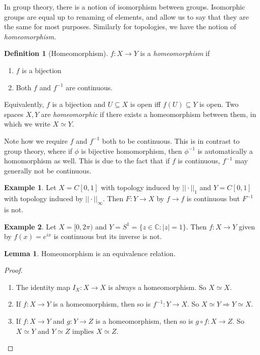 \documentclass[a4paper,11pt]{article}
\theoremstyle{definition}
\newtheorem*{defn}{Definition}
\newtheorem*{ex}{Example}
\newtheorem*{lem}{Lemma}
\numberwithin{equation}{section}
\begin{document}
In group theory, there is a notion of isomorphism between groups. Isomorphic groups are equal up to renaming of elements, and allow us to say that they are the same for most purposes. Similarly for topologies, we have the notion of \emph{homeomorphism}. 

\begin{defn}[Homeomorphism]
$f:X\rightarrow Y$ is a \emph{homeomorphism} if 
\begin{enumerate}
    \item $f$ is a bijection
    \item Both $f$ and $f^{-1}$ are continuous.
\end{enumerate}
Equivalently, $f$ is a bijection and $U\subseteq X$ is open iff $f(U)\subseteq Y$ is open. 
Two spaces $X,Y$ are \emph{homeomorphic} if there exists a homeomorphism between them, in which we write $X\simeq Y$.
\end{defn}

Note how we require $f$ and $f^{-1}$ both to be continuous. This is in contrast to group theory, where if $\phi$ is bijective homomorphism, then $\phi^{-1}$ is automatically a homomorphism as well. This is due to the fact that if $f$ is continuous, $f^{-1}$ may generally not be continuous.

\begin{ex}
Let $X=C[0,1]$ with topology induced by $||\cdot||_1$ and $Y=C[0,1]$ with topology induced by $||\cdot||_\infty$. Then $F:Y\rightarrow X$ by $f\rightarrow f$ is continuous but $F^{-1}$ is not.
\end{ex}

\begin{ex}
Let $X=[0,2\pi)$ and $Y=S^1=\{z\in\mathbb{C}:|z|=1\}$. Then $f:X\rightarrow Y$ given by $f(x)=e^{ix}$ is continuous but its inverse is not.
\end{ex}

\begin{lem}
Homeomorphism is an equivalence relation.
\end{lem}

\begin{proof}
\leavevmode
\begin{enumerate}
    \item The identity map $I_X:X\rightarrow X$ is always a homeomorphism. So $X\simeq X$.
    \item If $f:X\rightarrow Y$ is a homeomorphism, then so is $f^{-1}:Y\rightarrow X$. So $X\simeq Y\Rightarrow Y\simeq X$.
    \item If $f:X\rightarrow Y$ and $g:Y\rightarrow Z$ is a homeomorphism, then so is $g\circ f:X\rightarrow Z$. So $X\simeq Y$ and $Y\simeq Z$ implies $X\simeq Z$.
\end{enumerate}
\end{proof}
\end{document}
